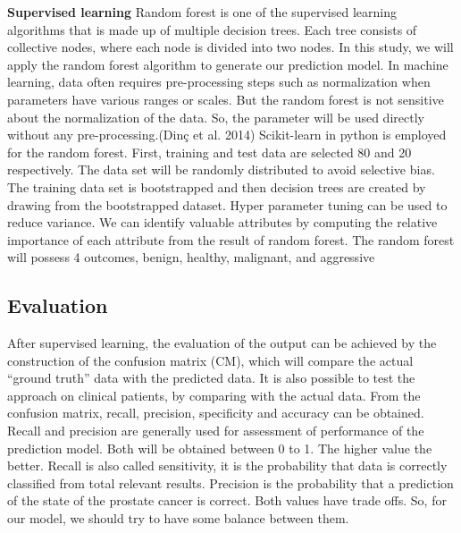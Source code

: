 \documentclass[11pt]{article}
\begin{document}
\newpage
\vspace{7mm}
\textbf{Supervised learning}
\newline
Random forest is one of the supervised learning algorithms that is made up of multiple decision trees. Each tree consists of collective nodes, where each node is divided into two nodes. In this study, we will apply the random forest algorithm to generate our prediction model. In machine learning, data often requires pre-processing steps such as normalization when parameters have various ranges or scales. But the random forest is not sensitive about the normalization of the data. So, the parameter will be used directly without any pre-processing.(Dinç et al. 2014)
Scikit-learn in python is employed for the random forest. First, training and test data are selected 80 and 20 respectively. The data set will be randomly distributed to avoid selective bias. The training data set is bootstrapped and then decision trees are created by drawing from the bootstrapped dataset. Hyper parameter tuning can be used to reduce variance. We can identify valuable attributes by computing the relative importance of each attribute from the result of random forest. The random forest will possess 4 outcomes, benign, healthy, malignant, and aggressive
\hfill \break
\vspace{5mm}

\subsection{Evaluation}
After supervised learning, the evaluation of the output can be achieved by the construction of the confusion matrix (CM), which will compare the actual “ground truth” data with the predicted data. It is also possible to test the approach on clinical patients, by comparing with the actual data. From the confusion matrix, recall,  precision, specificity and accuracy can be obtained. Recall and precision are generally used for assessment of performance of the prediction model. Both will be obtained between 0 to 1. The higher value the better. Recall is also called sensitivity, it is the  probability that data is correctly classified from total relevant results. Precision is the probability that a prediction of the state of the prostate cancer is correct. Both values have trade offs. So, for our model, we should try to have some balance between them.
\end{document}
